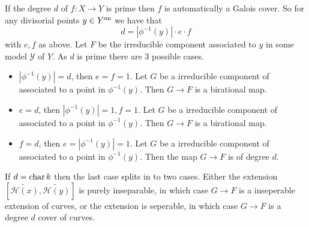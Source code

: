 \begin{remark}
	If the degree  $d$ of $f: X \to Y$ is prime then $f$ is automatically a Galois cover.
	So for any divisorial points $y \in Y{}^{\text{an}}$ we have that \[
		d = |\phi^{-1}(y)| \cdot e \cdot f
	\] 
	with $e, f$ as above. 
	Let $F$ be the irreducible component associated to $y$ in some model $\mathscr Y$ of $Y$. 
	As $d$ is prime there are 3 possible cases. 
	\begin{itemize}
		\item $|\phi^{-1}(y)| = d$, then $e = f = 1$. Let $G$ be a irreducible component of associated to a point in $\phi^{-1}(y)$. 
			Then $G \to F$ is a birational map. 
		\item $e = d$, then $|\phi^{-1}(y)| = 1, f = 1$. Let $G$ be a irreducible component of associated to a point in $\phi^{-1}(y)$. 
			Then $G \to F$ is a birational map. 
		\item $f = d$, then $e = |\phi^{-1}(y)| = 1$. Let $G$ be a irreducible component of associated to a point in $\phi^{-1}(y)$. 
			Then the map $G \to F$ is of degree $d$. 
	\end{itemize}
	If $d = \operatorname{char} k$ then the last case splits in to two cases. 
	Either the extension $\left[\widetilde{\mathcal{H} (x)}, \widetilde {\mathcal{H} (y)}\right]$ is purely inseparable, in which case $G \to F$ is a inseperable extension of curves, or the extension is seperable, in which case $G \to F$ is a degree $d$ cover of curves.
\end{remark}

